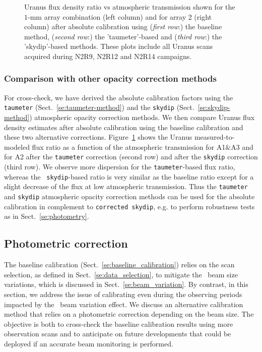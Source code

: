 \begin{figure}[!htbp]
\begin{center}
  \caption[Uranus flux density stability against atmospheric
    transmission]{Uranus flux density ratio vs atmospheric transmission
    shown for the $1$-mm array
    combination (left column) and for array 2 (right column) after absolute
    calibration using (\emph{first row}:) the baseline method, (\emph{second row}:) the 'taumeter'-based and
    (\emph{third row}:) the 'skydip'-based methods. These plots
    include all Uranus scans acquired during N2R9, N2R12 and N2R14
    campaigns. }
  \label{fig:calib_uranus_vs_atmtrans}
\end{center}
\end{figure}
%


\subsubsection{Comparison with other opacity correction methods}
\label{se:baseline_calibration_opacity}

For cross-check, we have derived the absolute
calibration factors using the {\tt taumeter}
(Sect.~\ref{se:taumeter-method}) and the {\tt skydip}
(Sect.~\ref{se:skydip-method}) atmospheric opacity
correction methods. We then compare Uranus
flux density estimates after absolute calibration using the baseline
calibration and these two alternative corrections. Figure~\ref{fig:calib_uranus_vs_atmtrans}
shows the Uranus measured-to-modeled
flux ratio as a function of the atmospheric transmission for A1$\&$A3
and for A2 after the {\tt taumeter} correction (second row) and
after the {\tt skydip} correction (third row). We observe more
dispersion for the {\tt taumeter}-based flux ratio, whereas the {\tt
skydip}-based ratio is very similar as the baseline ratio except
for a slight decrease of the flux at low atmospheric
transmission. Thus the {\tt taumeter} and {\tt skydip} atmospheric
opacity correction methods can be used for
the absolute calibration in complement to {\tt corrected skydip}, e.g. to
perform robustness tests as in Sect.~\ref{se:photometry}. 



\subsection{Photometric correction}
\label{se:photometric_correction}

The baseline calibration (Sect.~\ref{se:baseline_calibration}) relies
on the scan selection, as defined in Sect.~\ref{se:data_selection}, to
mitigate the \afternoon\ beam size variations, which is discussed in
Sect.~\ref{se:beam_variation}. By contrast, in this section, we
address the issue of calibrating even during the observing periods
impacted by the \afternoon\ beam variation effect. We discuss an
alternative calibration method that
relies on a photometric correction depending on the beam size. The
objective is both to cross-check the baseline calibration results
using more observation scans and to anticipate on future developments
that could be deployed if an accurate beam monitoring is performed.


